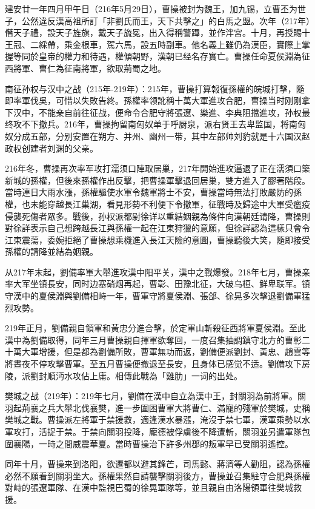 建安廿一年四月甲午日（216年5月29日），曹操被封为魏王，加九锡，立曹丕为世子，公然違反漢高祖所訂「非劉氏而王，天下共擊之」的白馬之盟。次年（217年）僭天子禮，設天子旌旗，戴天子旒冕，出入得稱警蹕，並作泮宮。十月，再授賜十王冠、二綵帶，乘金根車，駕六馬，設五時副車。他名義上雖仍為漢臣，實際上掌握等同於皇帝的權力和待遇，權傾朝野，漢朝已经名存實亡。曹操任命夏侯淵為征西將軍、曹仁為征南將軍，欲取荊蜀之地。

南征孙权与汉中之战（215年-219年）：215年，曹操打算報復孫權的皖城打擊，隨即率軍伐吳，可惜以失敗告終。孫權率领訛稱十萬大軍進攻合肥，曹操当时刚刚拿下汉中，不能亲自前往征战，便命令合肥守將張遼、樂進、李典阻擋進攻，孙权最终攻不下撤兵。216年，曹操拘留南匈奴单于呼厨泉，派右贤王去卑监国，将南匈奴分成五部，分别安置在朔方、并州、幽州一带，其中左部帅刘豹就是十六国汉赵政权创建者刘渊的父亲。

216年冬，曹操再次率军攻打濡须口陣取居巢，217年開始進攻逼退了正在濡須口築新城的孫權，但後來孫權作出反擊，把曹操軍擊退回居巢，雙方進入了膠著階段。當時連日大雨水漲，孫權驅使水軍令魏軍將士不安，曹操當時無法打敗嚴防的孫權，也未能穿越長江巢湖，看見形勢不利便下令撤軍，征戰時及歸途中大軍受瘟疫侵襲死傷者眾多。戰後，孙权派都尉徐详以重結姻親為條件向漢朝廷请降，曹操則對徐詳表示自己想跨越長江與孫權一起在江東狩獵的意願，但徐詳認為這樣只會令江東震蕩，委婉拒絕了曹操想乘機進入長江天險的意圖，曹操聽後大笑，隨即接受孫權的請降並結為姻親。

从217年末起，劉備率軍大舉進攻漢中阳平关，漢中之戰爆發。218年七月，曹操亲率大军坐镇長安，同时边塞硝烟再起，曹彰、田豫北征，大破乌桓、鲜卑联军。镇守漢中的夏侯淵與劉備相峙一年，曹軍守將夏侯淵、張郃、徐晃多次擊退劉備軍猛烈攻勢。

219年正月，劉備親自領軍和黃忠分進合擊，於定軍山斬殺征西將軍夏侯淵。至此漢中為劉備取得，同年三月曹操親自揮軍欲奪回，一度召集抽調鎮守北方的曹彰二十萬大軍增援，但是都為劉備所敗，曹軍無功而返，劉備便派劉封、黃忠、趙雲等將晝夜不停攻擊曹軍。至五月曹操便撤退至長安，且身体已感觉不适。劉備攻下房陵，派劉封順沔水攻佔上庸。相傳此戰為「雞肋」一词的出处。

樊城之战（219年）：219年七月，劉備在漢中自立為漢中王，封關羽為前將軍。關羽起荊襄之兵大舉北伐襄樊，進一步圍困曹軍大將曹仁、滿寵的殘軍於樊城，史稱樊城之戰。曹操派左將軍于禁援救，適逢漢水暴漲，淹沒于禁七軍，漢軍乘勢以水軍攻打，活捉于禁。于禁向關羽投降，龐德被俘虜後不降遭斬，關羽並另遣軍隊包圍襄陽，一時之間威震華夏。當時曹操治下許多州郡的叛軍早已受關羽遙控。

同年十月，曹操来到洛阳，欲遷都以避其鋒芒，司馬懿、蔣濟等人勸阻，認為孫權必然不願看到關羽坐大。孫權果然自請襲擊關羽後方，曹操並召集駐守合肥與孫權對峙的張遼軍隊、在漢中監視巴蜀的徐晃軍隊等，並且親自由洛陽領軍往樊城救援。

